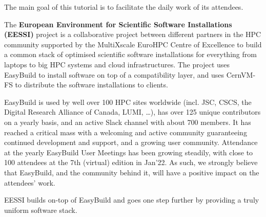 The main goal of this tutorial is to facilitate the daily work of its attendees.

The \textbf{European Environment for Scientific Software Installations (EESSI)} project is a collaborative project between different partners in the HPC community supported by the MultiXscale EuroHPC Centre of Excellence to build a common stack of optimised scientific software installations for everything from laptops to big HPC systems and cloud infrastructures. The project uses EasyBuild to install software on top of a compatibility layer, and uses CernVM-FS to distribute the software installations to clients.

EasyBuild is used by well over 100 HPC sites worldwide (incl. JSC, CSCS, the Digital Research Alliance of Canada, LUMI, \ldots),
has over 125 unique contributors on a yearly basis,
and an active Slack channel with about 700 members.
It has reached a critical mass with a welcoming and active community guaranteeing continued development and support, and a
growing user community.
Attendance at the yearly EasyBuild User Meetings has been growing steadily, with close to 100 attendees at the 7th (virtual) edition in Jan'22.
As such, we strongly believe that EasyBuild, and the community behind it, will have a positive impact on the attendees' work.

EESSI builds on-top of EasyBuild and goes one step further by providing a truly uniform software stack.

